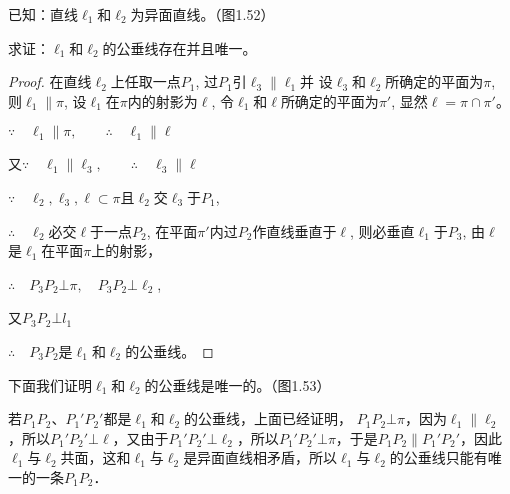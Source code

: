   \begin{example}
    已知：直线$\ell_1$和$\ell_2$为异面直线。（图1.52）
  
  求证：$\ell_1$和$\ell_2$的公垂线存在并且唯一。
  \end{example}
  
  \begin{proof}
  在直线$\ell_2$上任取一点$P_1$, 过$P_1$引$\ell_3\parallel \ell_1$并
  设$\ell_3$和$\ell_2$所确定的平面为$\pi$, 则$\ell_1\parallel\pi$, 设$\ell_1$在$\pi$内的射影为$\ell$, 令$\ell_1$和$\ell$所确定的平面为$\pi'$, 显然$\ell=\pi\cap \pi'$。
  
  $\because \quad \ell_1\parallel \pi,\qquad \therefore\quad \ell_1\parallel \ell$
  
  又$\because\quad \ell_1\parallel \ell_3,\qquad \therefore\quad \ell_3\parallel \ell$
  
  $\because\quad \ell_2,\ell_3,\ell\subset \pi$且$\ell_2$交$\ell_3$于$P_1$, 
  
  $\therefore\quad \ell_2$必交$\ell$于一点$P_2$, 在平面$\pi'$内过$P_2$作直线垂直于$\ell$, 则必垂直$\ell_1$于$P_3$, 由$\ell$是$\ell_1$在平面$\pi$上的射影，
  
  $\therefore\quad P_3P_2\bot\pi,\quad P_3P_2\bot \ell_2$, 
  
  又$P_3P_2\bot l_1$
  
  $\therefore\quad P_3P_2$是$\ell_1$和$\ell_2$的公垂线。 
  \end{proof}
  
  下面我们证明$\ell_1$和$\ell_2$的公垂线是唯一的。（图1.53）
  
  \begin{figure}[htp]
    \centering
    \caption{}
  \end{figure}
  
  若$P_1P_2$、$P_1'P_2'$都是$\ell_1$和$\ell_2$的公垂线，上面已经证明，
  $P_1P_2\bot\pi$，因为$\ell_1\parallel \ell_2$，所以$P_1'P_2'\bot\ell$，又由于$P_1'P_2'\bot \ell_2$，所以$P_1'P_2'\bot \pi$，于是$P_1P_2\parallel P_1'P_2'$，因此$\ell_1$与$\ell_2$共面，这和$\ell_1$与$\ell_2$是异面直线相矛盾，所以$\ell_1$与$\ell_2$的公垂线只能有唯一的一条$P_1P_2$．
  
